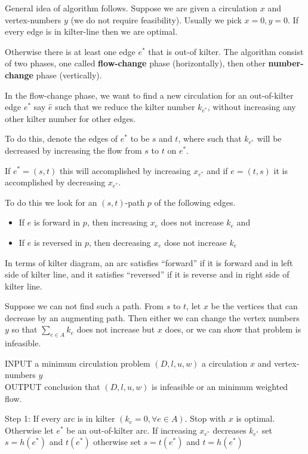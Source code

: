 			General idea of algorithm follows. Suppose we are given a circulation $x$ and vertex-numbers $y$ (we do not require feasibility). Usually we pick $x=0, y=0$. If every edge is in kilter-line then we are optimal.

			Otherwise there is at least one edge $e^*$ that is out-of kilter. The algorithm consist of two phases, one called \textbf{flow-change} phase (horizontally), then other \textbf{number-change} phase (vertically).

			In the flow-change phase, we want to find a new circulation for an out-of-kilter edge $e^*$ say $\hat{e}$ such that we reduce the kilter number $k_{e^*}$, without increasing any other kilter number for other edges.

			To do this, denote the edges of $e^*$ to be $s$ and $t$, where such that $k_{e^*}$ will be decreased by increasing the flow from $s$ to $t$ on $e^*$.

			If $e^*=(s, t)$ this will accomplished by increasing $x_{e^*}$ and if $e=(t, s)$ it is accomplished by decreasing $x_{e^*}$. 

			To do this we look for an $(s, t)$-path $p$ of the following edges.

			\begin{itemize}
				\item If $e$ is forward in $p$, then increasing $x_e$ does not increase $k_e$ and
				\item If $e$ is reversed in $p$, then decreasing $x_e$ dose not increase $k_e$
			\end{itemize}

			In terms of kilter diagram, an arc satisfies ``forward'' if it is forward and in left side of kilter line, and it satisfies ``reversed'' if it is reverse and in right side of kilter line.

			Suppose we can not find such a path. From $s$ to $t$, let $x$ be the vertices that can decrease by an augmenting path. Then either we can change the vertex numbers $y$ so that $\sum_{e\in A} k_e$ does not increase but $x$ does, or we can show that problem is infeasible.

			INPUT a minimum circulation problem $(D, l, u, w)$ a circulation $x$ and vertex-numbers $y$\\
			OUTPUT conclusion that $(D, l, u, w)$ is infeasible or an minimum weighted flow.

			Step 1: If every arc is in kilter $(k_e = 0, \forall e\in A)$. Stop with $x$ is optimal. Otherwise let $e^*$ be an out-of-kilter arc. If increasing $x_{e^*}$ decreases $k_{e^*}$ set $s=h(e^*)$ and $t(e^*)$ otherwise set $s=t(e^*)$ and $t=h(e^*)$

